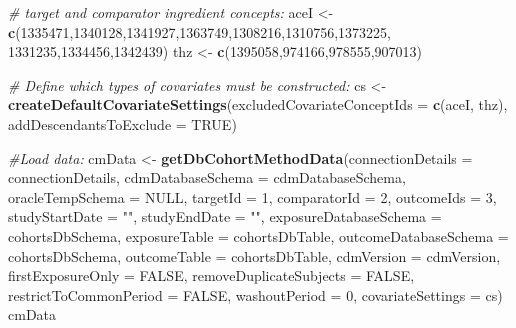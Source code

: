 \documentclass[]{book}
\newenvironment{Shaded}{\begin{snugshade}}{\end{snugshade}}
\newcommand{\KeywordTok}[1]{\textcolor[rgb]{0.13,0.29,0.53}{\textbf{#1}}}
\newcommand{\DataTypeTok}[1]{\textcolor[rgb]{0.13,0.29,0.53}{#1}}
\newcommand{\DecValTok}[1]{\textcolor[rgb]{0.00,0.00,0.81}{#1}}
\newcommand{\StringTok}[1]{\textcolor[rgb]{0.31,0.60,0.02}{#1}}
\newcommand{\CommentTok}[1]{\textcolor[rgb]{0.56,0.35,0.01}{\textit{#1}}}
\newcommand{\OtherTok}[1]{\textcolor[rgb]{0.56,0.35,0.01}{#1}}
\newcommand{\NormalTok}[1]{#1}
\begin{document}
\begin{Shaded}
\begin{Highlighting}[]
\CommentTok{# target and comparator ingredient concepts:}
\NormalTok{aceI <-}\StringTok{ }\KeywordTok{c}\NormalTok{(}\DecValTok{1335471}\NormalTok{,}\DecValTok{1340128}\NormalTok{,}\DecValTok{1341927}\NormalTok{,}\DecValTok{1363749}\NormalTok{,}\DecValTok{1308216}\NormalTok{,}\DecValTok{1310756}\NormalTok{,}\DecValTok{1373225}\NormalTok{,}
          \DecValTok{1331235}\NormalTok{,}\DecValTok{1334456}\NormalTok{,}\DecValTok{1342439}\NormalTok{)}
\NormalTok{thz <-}\StringTok{ }\KeywordTok{c}\NormalTok{(}\DecValTok{1395058}\NormalTok{,}\DecValTok{974166}\NormalTok{,}\DecValTok{978555}\NormalTok{,}\DecValTok{907013}\NormalTok{)}

\CommentTok{# Define which types of covariates must be constructed:}
\NormalTok{cs <-}\StringTok{ }\KeywordTok{createDefaultCovariateSettings}\NormalTok{(}\DataTypeTok{excludedCovariateConceptIds =} \KeywordTok{c}\NormalTok{(aceI, }
\NormalTok{                                                                     thz),}
                                     \DataTypeTok{addDescendantsToExclude =} \OtherTok{TRUE}\NormalTok{)}

\CommentTok{#Load data:}
\NormalTok{cmData <-}\StringTok{ }\KeywordTok{getDbCohortMethodData}\NormalTok{(}\DataTypeTok{connectionDetails =}\NormalTok{ connectionDetails,}
                                \DataTypeTok{cdmDatabaseSchema =}\NormalTok{ cdmDatabaseSchema,}
                                \DataTypeTok{oracleTempSchema =} \OtherTok{NULL}\NormalTok{,}
                                \DataTypeTok{targetId =} \DecValTok{1}\NormalTok{,}
                                \DataTypeTok{comparatorId =} \DecValTok{2}\NormalTok{,}
                                \DataTypeTok{outcomeIds =} \DecValTok{3}\NormalTok{,}
                                \DataTypeTok{studyStartDate =} \StringTok{""}\NormalTok{,}
                                \DataTypeTok{studyEndDate =} \StringTok{""}\NormalTok{,}
                                \DataTypeTok{exposureDatabaseSchema =}\NormalTok{ cohortsDbSchema,}
                                \DataTypeTok{exposureTable =}\NormalTok{ cohortsDbTable,}
                                \DataTypeTok{outcomeDatabaseSchema =}\NormalTok{ cohortsDbSchema,}
                                \DataTypeTok{outcomeTable =}\NormalTok{ cohortsDbTable,}
                                \DataTypeTok{cdmVersion =}\NormalTok{ cdmVersion,}
                                \DataTypeTok{firstExposureOnly =} \OtherTok{FALSE}\NormalTok{,}
                                \DataTypeTok{removeDuplicateSubjects =} \OtherTok{FALSE}\NormalTok{,}
                                \DataTypeTok{restrictToCommonPeriod =} \OtherTok{FALSE}\NormalTok{,}
                                \DataTypeTok{washoutPeriod =} \DecValTok{0}\NormalTok{,}
                                \DataTypeTok{covariateSettings =}\NormalTok{ cs)}
\NormalTok{cmData}
\end{Highlighting}
\end{Shaded}
\end{document}
